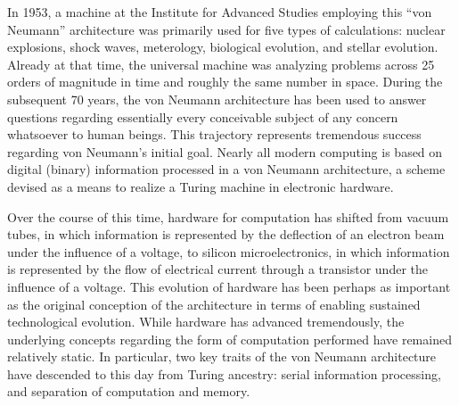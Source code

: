 \documentclass[twocolumn]{article}
\begin{document}
In 1953, a machine at the Institute for Advanced Studies employing this ``von Neumann'' architecture was primarily used for five types of calculations: nuclear explosions, shock waves, meterology, biological evolution, and stellar evolution. Already at that time, the universal machine was analyzing problems across 25 orders of magnitude in time and roughly the same number in space. During the subsequent 70 years, the von Neumann architecture has been used to answer questions regarding essentially every conceivable subject of any concern whatsoever to human beings. This trajectory represents tremendous success regarding von Neumann's initial goal. Nearly all modern computing is based on digital (binary) information processed in a von Neumann architecture, a scheme devised as a means to realize a Turing machine in electronic hardware. 

Over the course of this time, hardware for computation has shifted from vacuum tubes, in which information is represented by the deflection of an electron beam under the influence of a voltage, to silicon microelectronics, in which information is represented by the flow of electrical current through a transistor under the influence of a voltage. This evolution of hardware has been perhaps as important as the original conception of the architecture  in terms of enabling sustained technological evolution. While hardware has advanced tremendously, the underlying concepts regarding the form of computation performed have remained relatively static. In particular, two key traits of the von Neumann architecture have descended to this day from Turing ancestry: serial information processing, and separation of computation and memory. 
\end{document}
